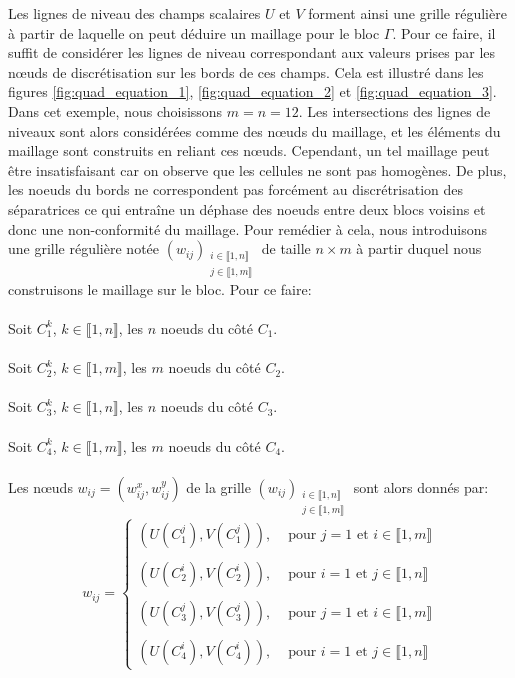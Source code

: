Les lignes de niveau des champs scalaires $U$ et $V$ forment ainsi une grille régulière à partir de laquelle on peut déduire un maillage pour le bloc $\Gamma$. Pour ce faire, il suffit de considérer les lignes de niveau correspondant aux valeurs prises par les nœuds de discrétisation sur les bords de ces champs. Cela est illustré dans les figures \ref{fig:quad_equation_1}, \ref{fig:quad_equation_2} et \ref{fig:quad_equation_3}. Dans cet exemple, nous choisissons $m=n=12$. Les intersections des lignes de niveaux sont alors considérées comme des nœuds du maillage, et les éléments du maillage sont construits en reliant ces nœuds. Cependant, un tel maillage peut être insatisfaisant car on observe que les cellules ne sont pas homogènes. De plus, les noeuds du bords ne correspondent pas forcément au discrétrisation des séparatrices ce qui entraîne un déphase des noeuds entre deux blocs voisins et donc une non-conformité du maillage. Pour remédier à cela, nous introduisons une grille régulière notée $(w_{ij})_{\substack{i\in\llbracket 1, n\rrbracket\\j\in\llbracket 1, m\rrbracket}}$  de taille $n\times m$ à partir duquel nous construisons le maillage sur le bloc. Pour ce faire:\\\\
Soit $C_1^k$, $k\in\llbracket 1, n\rrbracket$, les $n$ noeuds du côté $C_1$.\\\\
Soit $C_2^k$, $k\in\llbracket 1, m\rrbracket$, les $m$ noeuds du côté $C_2$.\\\\
Soit $C_3^k$, $k\in\llbracket 1, n\rrbracket$, les $n$ noeuds du côté $C_3$.\\\\
Soit $C_4^k$, $k\in\llbracket 1, m\rrbracket$, les $m$ noeuds du côté $C_4$.\\\\
Les nœuds $w_{ij}=(w_{ij}^x, w_{ij}^y)$ de la grille $(w_{ij})_{\substack{i\in\llbracket 1, n\rrbracket\\j\in\llbracket 1, m\rrbracket}}$ sont alors  donnés par:
\begin{equation}
w_{ij}=
\left\{
\begin{array}{ll}
(U(C_1^j), V(C_1^j)),&\mbox{ pour } j=1 \mbox{ et } i\in\llbracket 1, m\rrbracket\\\\
(U(C_2^i), V(C_2^i)),&\mbox{ pour } i=1 \mbox{ et } j\in\llbracket 1, n\rrbracket\\\\
(U(C_3^j), V(C_3^j)),&\mbox{ pour } j=1 \mbox{ et } i\in\llbracket 1, m\rrbracket\\\\
(U(C_4^i), V(C_4^i)),&\mbox{ pour } i=1 \mbox{ et } j\in\llbracket 1, n\rrbracket
\end{array}
\right.
\end{equation}
